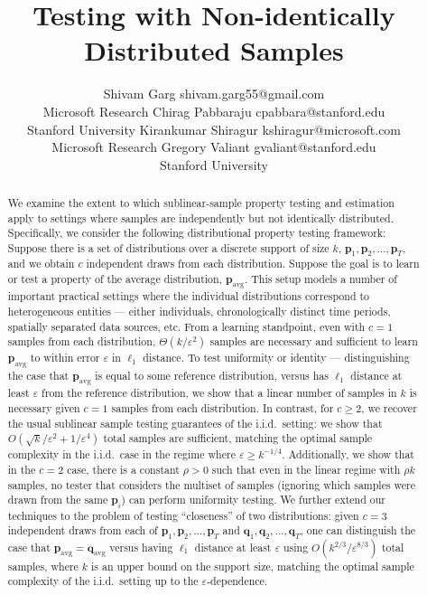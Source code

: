 \documentclass[10pt]{article} %
\title{Testing with Non-identically Distributed Samples}
\author{\name Shivam Garg \email shivam.garg55@gmail.com \\
      \addr Microsoft Research
      \AND
      \name Chirag Pabbaraju \email cpabbara@stanford.edu \\
      \addr Stanford University
      \AND
      \name Kirankumar Shiragur \email kshiragur@microsoft.com \\
      \addr Microsoft Research
      \AND
      \name Gregory Valiant \email gvaliant@stanford.edu\\
      \addr Stanford University}
\def\eps{{\varepsilon}}
\theoremstyle{plain}
\begin{document}
\maketitle

\begin{abstract}
    We examine the extent to which sublinear-sample property testing and estimation apply to settings where samples are independently but not identically distributed.  Specifically, we consider the following distributional property testing framework: Suppose there is a set of distributions over a discrete support of size $k$, $\textbf{p}_1, \textbf{p}_2,\ldots,\textbf{p}_T$, and we obtain $c$ independent draws from each distribution.  Suppose the goal is to learn or test a property of the average distribution, $\textbf{p}_{\mathrm{avg}}$.  This setup models a number of important practical settings where the individual distributions correspond to heterogeneous entities --- either individuals, chronologically distinct time periods, spatially separated data sources, etc.  From a learning standpoint, even with $c=1$ samples from each distribution, $\Theta(k/\varepsilon^2)$ samples are necessary and sufficient to learn $\textbf{p}_{\mathrm{avg}}$ to within error $\varepsilon$ in $\ell_1$ distance.  To test uniformity or identity --- distinguishing the case that $\textbf{p}_{\mathrm{avg}}$ is equal to some reference distribution, versus has $\ell_1$ distance at least $\varepsilon$ from the reference distribution, we show that a linear number of samples in $k$ is necessary given $c=1$ samples from each distribution.  In contrast, for $c \ge 2$, we recover the usual sublinear sample testing guarantees of the i.i.d.\ setting: we show that $O(\sqrt{k}/\varepsilon^2 + 1/\varepsilon^4)$ total samples are sufficient, matching the optimal sample complexity in the i.i.d.\ case in the regime where $\varepsilon \ge k^{-1/4}$. Additionally, we show that in the $c=2$ case, there is a constant $\rho > 0$ such that even in the linear regime with $\rho k$ samples, no tester that  considers the multiset of samples (ignoring which samples were drawn from the same $\textbf{p}_i$) can perform uniformity testing.  We further extend our techniques to the problem of testing ``closeness'' of two distributions: given $c=3$ independent draws from each of $\textbf{p}_1, \textbf{p}_2,\ldots,\textbf{p}_T$ and $\textbf{q}_1, \textbf{q}_2,\ldots,\textbf{q}_T$, one can distinguish the case that $\textbf{p}_{\mathrm{avg}}=\textbf{q}_{\mathrm{avg}}$ versus having $\ell_1$ distance at least $\varepsilon$ using $O(k^{2/3}/\eps^{8/3})$ total samples, where $k$ is an upper bound on the support size, matching the optimal sample complexity of the i.i.d.\ setting up to the $\varepsilon$-dependence.
\end{abstract}
\end{document}
